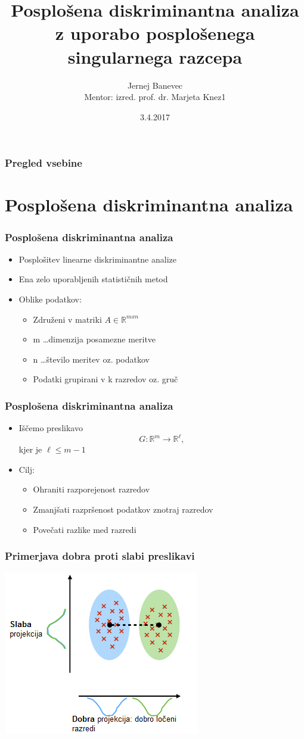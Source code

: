 \documentclass{beamer}
\title[dolga predstavitev diplomskega dela]{Posplošena diskriminantna analiza z uporabo posplošenega singularnega razcepa }
\author[Jernej Banevec]{Jernej Banevec\\
\medskip
{\small Mentor: izred. prof. dr. Marjeta Knez1}
}
\institute[FMF] 
{
Fakulteta za matematiko in fiziko\\ 
\medskip
\textit{dolga predstavitev diplomskega dela} 
}
\date{3.4.2017}
\begin{document}
\begin{frame}
\titlepage
\end{frame}

\begin{frame}
\frametitle{Pregled vsebine} 
\tableofcontents 
\end{frame}


\section{Posplošena diskriminantna analiza}

\begin{frame}
\frametitle{Posplošena diskriminantna analiza}
\begin{itemize}
\item Posplošitev linearne diskriminantne analize
\item Ena zelo uporabljenih statističnih metod
\item Oblike podatkov:
\begin{itemize}
\item Združeni v matriki $A \in \mathbb{R}^{mxn}$
\item m \ldots dimenzija posamezne meritve
\item n \ldots število meritev oz. podatkov
\item Podatki grupirani v k razredov oz. gruč
\end{itemize}
\end{itemize}
\end{frame}


\begin{frame}
\frametitle{Posplošena diskriminantna analiza}
\begin{itemize}
\item Iščemo preslikavo $$G : \mathbb{R}^m \rightarrow \mathbb{R}^\ell ,$$ kjer je $\ell \leqslant m - 1$
\item Cilj:
\begin{itemize}
\item Ohraniti razporejenost razredov
\item Zmanjšati razpršenost podatkov znotraj razredov
\item Povečati razlike med razredi
\end{itemize}
\end{itemize}
\end{frame}


\begin{frame}
\frametitle{Primerjava dobra proti slabi preslikavi}
\includegraphics[scale = 0.85]{dobra-slaba}
\end{frame}
\end{document}

